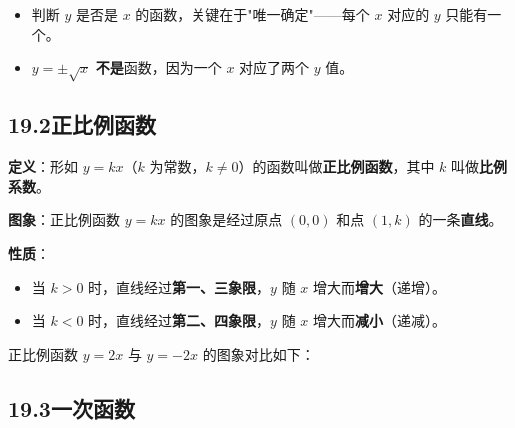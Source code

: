 \documentclass[12pt, a4paper]{ctexart}
\begin{document}
\begin{warnbox}[易错提醒]
\begin{itemize}[leftmargin=2em]
  \item 判断 $y$ 是否是 $x$ 的函数，关键在于"唯一确定"——每个 $x$ 对应的 $y$ 只能有一个。
  \item $y = \pm\sqrt{x}$ \textbf{不是}函数，因为一个 $x$ 对应了两个 $y$ 值。
\end{itemize}
\end{warnbox}

\subsection*{19.2\quad 正比例函数}

\begin{knowledgebox}[正比例函数的定义与图象]
\textbf{定义}：形如 $y = kx$（$k$ 为常数，$k\neq 0$）的函数叫做\textbf{正比例函数}，其中 $k$ 叫做\textbf{比例系数}。

\textbf{图象}：正比例函数 $y=kx$ 的图象是经过原点 $(0,0)$ 和点 $(1,k)$ 的一条\textbf{直线}。

\textbf{性质}：
\begin{itemize}[leftmargin=2em]
  \item 当 $k>0$ 时，直线经过\textbf{第一、三象限}，$y$ 随 $x$ 增大而\textbf{增大}（递增）。
  \item 当 $k<0$ 时，直线经过\textbf{第二、四象限}，$y$ 随 $x$ 增大而\textbf{减小}（递减）。
\end{itemize}
\end{knowledgebox}

正比例函数 $y = 2x$ 与 $y = -2x$ 的图象对比如下：

\begin{center}
\end{center}

\subsection*{19.3\quad 一次函数}
\end{document}
